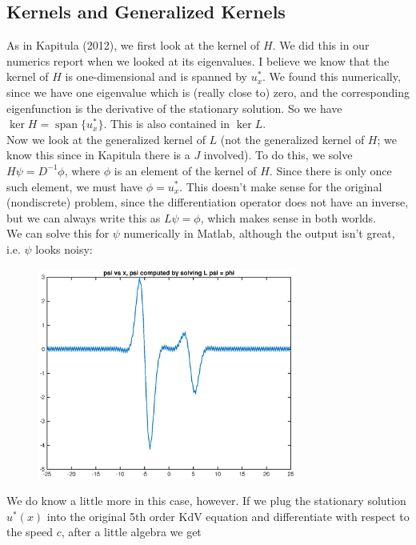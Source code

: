 \documentclass[12pt]{article}
\DeclareMathOperator{\spn}{span}
\begin{document}
\subsection{Kernels and Generalized Kernels}

As in Kapitula (2012), we first look at the kernel of $H$. We did this in our numerics report when we looked at its eigenvalues. I believe we know that the kernel of $H$ is one-dimensional and is spanned by $u^*_x$. We found this numerically, since we have one eigenvalue which is (really close to) zero, and the corresponding eigenfunction is the derivative of the stationary solution. So we have $\ker H = \spn\{ u^*_x \}$. This is also contained in $\ker L$.\\

Now we look at the generalized kernel of $L$ (not the generalized kernel of $H$; we know this since in Kapitula there is a $J$ involved). To do this, we solve $H\psi = D^{-1} \phi$, where $\phi$ is an element of the kernel of $H$. Since there is only once such element, we must have $\phi = u^*_x$. This doesn't make sense for the original (nondiscrete) problem, since the differentiation operator does not have an inverse, but we can always write this as $L\psi = \phi$, which makes sense in both worlds.\\

We can solve this for $\psi$ numerically in Matlab, although the output isn't great, i.e. $\psi$ looks noisy:

\begin{figure}[H]
	\includegraphics[width=8.5cm]{solvedpsi.eps}
\end{figure}

We do know a little more in this case, however. If we plug the stationary solution $u^*(x)$ into the original 5th order KdV equation and differentiate with respect to the speed $c$, after a little algebra we get
\end{document}
